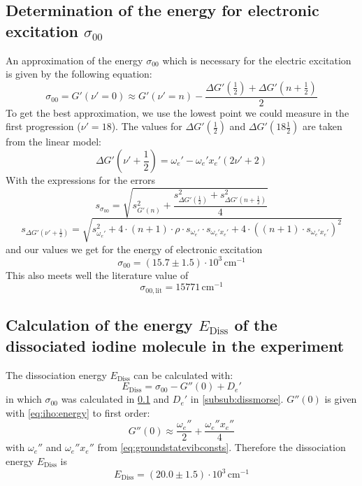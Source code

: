 \subsection{Determination of the energy for electronic excitation \texorpdfstring{$\sigma_{00}$}{s00}}
\label{sub:sigma00}
An approximation of the energy $\sigma_{00}$ which is necessary for the electric excitation is given
by the following equation:
\begin{equation}
  \sigma_{00} = G'(\nu' = 0) \approx G'(\nu' = n) - \frac{\Delta G' \left( \frac{1}{2} \right) + \Delta G' \left( n + \frac{1}{2} \right) }{2}
\end{equation}
To get the best approximation, we use the lowest point we could measure in the first progression ($\nu'=18$).
The values for $\Delta G'(\frac{1}{2})$ and $\Delta G'(18\frac{1}{2})$ are taken from the linear model:
\begin{equation}
  \Delta G'(\nu' + \frac{1}{2}) = \omega_e' - \omega_e' x_e' (2\nu' + 2)
\end{equation}
With the expressions for the errors
\begin{equation}
  s_{\sigma_{00}} = \sqrt{s_{G'(n)}^2 + \frac{s_{\Delta G' \left( \frac{1}{2} \right)}^2 + s_{\Delta G' \left( n + \frac{1}{2} \right)}^2}{4}}
\end{equation}
\begin{equation}
  s_{\Delta G'(\nu' + \frac{1}{2})} = \sqrt{s_{\omega_e'}^2 + 4 \cdot (n+1) \cdot \rho \cdot s_{\omega_e'} \cdot s_{\omega_e' x_e'} + 4 \cdot ((n+1) \cdot s_{\omega_e' x_e'})^2}
\end{equation}
and our values we get for the energy of electronic excitation
\begin{equation}
  \sigma_{00} = (15.7 \pm 1.5)\cdot 10^3 \,\text{cm}^{-1}
\end{equation}
This also meets well the literature value of \cite{steinfeld}
\begin{equation}
  \sigma_{00,\text{lit}} = 15771\,\text{cm}^{-1}
\end{equation}


\subsection{Calculation of the energy \texorpdfstring{$E_{\text{Diss}}$}{E diss} of the dissociated iodine molecule in the experiment}
The dissociation energy $E_{\text{Diss}}$ can be calculated with:
\begin{equation}
  E_{\text{Diss}} = \sigma_{00} - G''(0) + D_e'
\end{equation}
in which $\sigma_{00}$ was calculated in \ref{sub:sigma00} and $D_e'$ in \ref{subsub:dissmorse}. 
$G''(0)$ is given with \autoref{eq:iho:energy} to first order:
\begin{equation}
  G''(0) \approx \frac{\omega_e''}{2} + \frac{\omega_e'' x_e''}{4}
\end{equation}
with $\omega_e''$ and $\omega_e'' x_e''$ from \autoref{eq:groundstatevibconsts}.
Therefore the dissociation energy $E_{\text{Diss}}$ is
\begin{equation}
  E_{\text{Diss}} = (20.0 \pm 1.5) \cdot 10^3\,\text{cm}^{-1}
\end{equation}



